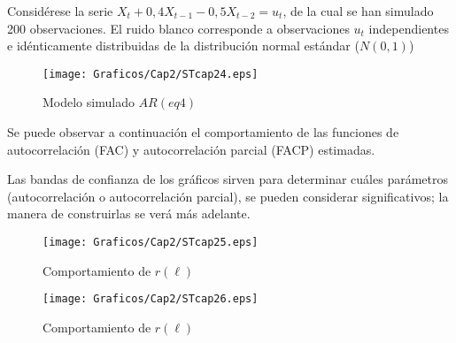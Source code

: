 \begin{ejemplo} Consid\'{e}rese la serie $X_{t}+0,4X_{t-1}-0,5X_{t-2}=u_{t}$, de la cual se han simulado 200 observaciones. El ruido blanco corresponde a observaciones $u_{t}$ independientes e id\'{e}nticamente distribuidas de la distribuci\'{o}n normal est\'{a}ndar ($N(0,1)$)

\begin{figure}[H]
\centering
\texttt{[image: Graficos/Cap2/STcap24.eps]}
\caption{Modelo simulado $AR(eq4)$}
\end{figure}

Se puede observar a continuaci\'{o}n el comportamiento de las funciones de autocorrelaci\'{o}n (FAC) y autocorrelaci\'{o}n parcial (FACP) estimadas.

Las bandas de confianza de los gr\'{a}ficos sirven para determinar cu\'{a}les par\'{a}metros (autocorrelaci\'{o}n o autocorrelaci\'{o}n parcial), se pueden considerar significativos; la manera de construirlas se ver\'{a} m\'{a}s adelante.

\begin{figure}[H]
\centering
\texttt{[image: Graficos/Cap2/STcap25.eps]}
\caption{Comportamiento de $r(\ell)$}
\end{figure}

\begin{figure}[H]
\centering
\texttt{[image: Graficos/Cap2/STcap26.eps]}
\caption{Comportamiento de $r(\ell)$}
\end{figure}

\end{ejemplo}


